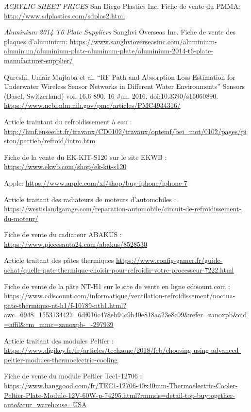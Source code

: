\begin{thebibliographyUL}{9}
 \emph{ACRYLIC SHEET PRICES} San Diego Plastics Inc. Fiche de vente du PMMA: \url{http://www.sdplastics.com/sdplas2.html}


 \emph{Aluminium 2014 T6 Plate Suppliers} Sanghvi Overseas Inc. Fiche de vente des plaques d'aluminium: \url{https://www.sanghvioverseasinc.com/aluminium-aluminum/aluminium-plate-aluminum-plate/aluminium-2014-t6-plate-manufacturer-supplier/}

 Qureshi, Umair Mujtaba et al. “RF Path and Absorption Loss Estimation for Underwater Wireless Sensor Networks in Different Water Environments” Sensors (Basel, Switzerland) vol. 16,6 890. 16 Jun. 2016, doi:10.3390/s16060890.  \url{https://www.ncbi.nlm.nih.gov/pmc/articles/PMC4934316/}

 Article traintant du refroidissement à eau :
\url{http://hmf.enseeiht.fr/travaux/CD0102/travaux/optemf/bei_mot/0102/pages/piston/partieb/refroid/intro.htm}

 Fiche de la vente du EK-KIT-S120 sur le site EKWB :
\url{https://www.ekwb.com/shop/ek-kit-s120}

 Apple: \url{https://www.apple.com/xf/shop/buy-iphone/iphone-7}

 Article traitant des radiateurs de moteurs d'automobiles :
\url{https://westislandgarage.com/reparation-automobile/circuit-de-refroidissement-du-moteur/}

 Fiche de vente du radiateur ABAKUS :
\url{https://www.piecesauto24.com/abakus/8528530}

 Article traitant des pâtes thermiques
\url{https://www.config-gamer.fr/guide-achat/quelle-pate-thermique-choisir-pour-refroidir-votre-processeur-7222.html}

 Fiche de vente de la pâte NT-H1 sur le site de vente en ligne cdisount.com :
\url{https://www.cdiscount.com/informatique/ventilation-refroidissement/noctua-pate-thermique-nt-h1/f-10789-nth1.html?awc=6948_1553134427_6df016c478eb94c9b40e818aa23e8c09&refer=zanoxpb&cid=affil&cm_mmc=zanoxpb-_-297939}

 Article traitant des modules Peltier :
\url{https://www.digikey.fr/fr/articles/techzone/2018/feb/choosing-using-advanced-peltier-modules-thermoelectric-cooling}

 Fiche de vente du module Peltier Tec1-12706 :
\url{https://www.banggood.com/fr/TEC1-12706-40x40mm-Thermoelectric-Cooler-Peltier-Plate-Module-12V-60W-p-74295.html?rmmds=detail-top-buytogether-auto&cur_warehouse=USA}


\end{thebibliographyUL}
